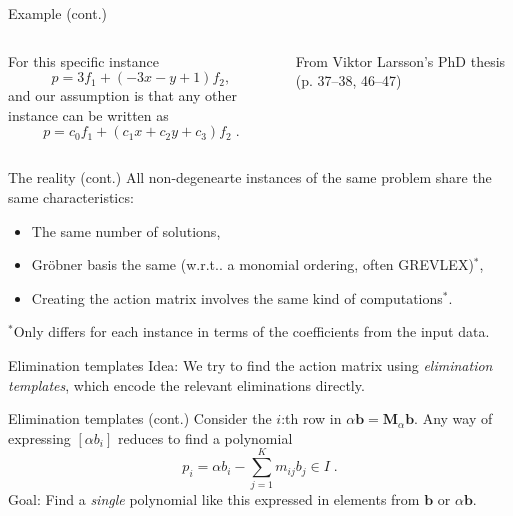 \documentclass[aspectratio=169]{beamer}
\makeatletter
\newcommand{\mat}[1]{\bm{#1}}
\DeclareRobustCommand\wrt{w.r.t\@ifnextchar.{}{.\@}}
\makeatother
\begin{document}
\begin{frame}[t]{Example (cont.)}
\vspace{1cm}
\begin{columns}
    \begin{column}{0.7\textwidth}
        For this specific instance
        \begin{equation*}
            p = 3f_1 + (-3x-y+1)f_2,
        \end{equation*}
        and our assumption is that any other instance can be written as
        \begin{equation*}
            p = c_0f_1 + (c_1x+c_2y+c_3)f_2\;.
        \end{equation*}
    \end{column}%
    \begin{column}{0.3\textwidth}
        \centering
        

        \vspace{5mm}

        {\scriptsize From Viktor Larsson's PhD thesis (p. 37--38, 46--47)}
    \end{column}
\end{columns}
\end{frame}

\begin{frame}{The reality (cont.)}
All non-degenearte instances of the same problem share the same characteristics:
\begin{itemize}
\item The same number of solutions,
\item Gröbner basis the same (\wrt{} a monomial ordering, often GREVLEX)${}^*$,
\item Creating the action matrix involves the same kind of computations${}^*$.
\end{itemize}
${}^*$Only differs for each instance in terms of the coefficients from the input data.
\end{frame}

\begin{frame}{Elimination templates}
\alert{Idea:} We try to find the action matrix using \emph{elimination templates},
which encode the relevant eliminations directly.
\end{frame}

\begin{frame}{Elimination templates (cont.)}
Consider the $i$:th row in $\alpha\mat{b} = \mat{M}_\alpha\mat{b}$.
Any way of expressing $[\alpha b_i]$ reduces to find a polynomial
\begin{equation}\label{eq:polys}
    p_i = \alpha b_i -\sum_{j=1}^Km_{ij}b_{j}\in I\;.
\end{equation}
\alert{Goal:} Find a \emph{single} polynomial like this expressed in elements from
$\mat{b}$ or $\alpha\mat{b}$.
\end{frame}
\end{document}
